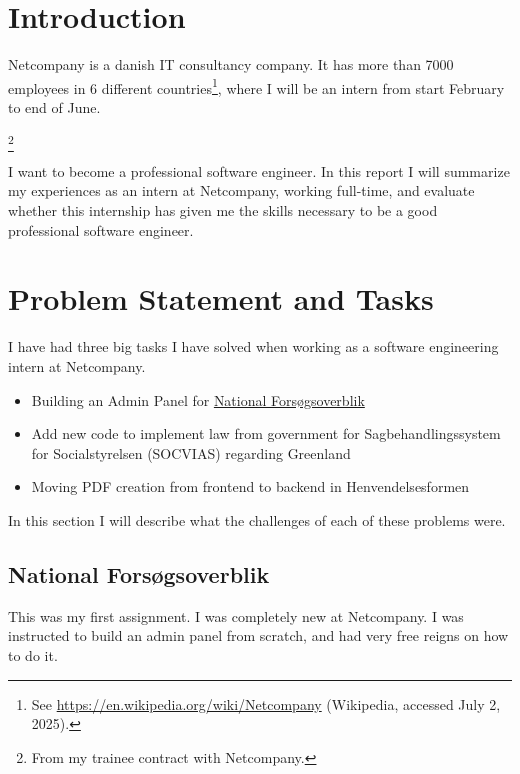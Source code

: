 \documentclass[../main.tex]{subfiles}
\begin{document}
\section{Introduction}

Netcompany is a danish IT consultancy company. It has more than 7000 employees in 6 different countries\footnote{See \url{https://en.wikipedia.org/wiki/Netcompany} (Wikipedia, accessed July 2, 2025).}, where I will be an intern from start February to end of June.

\footnote{From my trainee contract with Netcompany.}

I want to become a professional software engineer. In this report I will summarize my experiences as an intern at Netcompany, working full-time, and evaluate whether this internship has given me the skills necessary to be a good professional software engineer.



\section{Problem Statement and Tasks}

I have had three big tasks I have solved when working as a software engineering intern at Netcompany. 

\begin{itemize}
    \item Building an Admin Panel for \href{https://nationaltforsoegsoverblik.dk/}{National Forsøgsoverblik} 
    \item Add new code to implement law from government for Sagbehandlingssystem for Socialstyrelsen (SOCVIAS) regarding Greenland
    \item Moving PDF creation from frontend to backend in Henvendelsesformen
\end{itemize}

In this section I will describe what the challenges of each of these problems were. 

\subsection{National Forsøgsoverblik}

This was my first assignment. I was completely new at Netcompany. I was instructed to build an admin panel from scratch, and had very free reigns on how to do it. 
\end{document}
